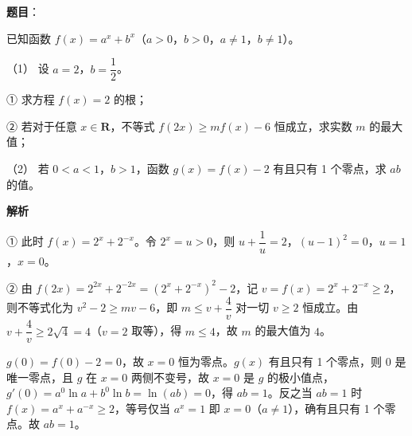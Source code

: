 \begin{answer}

\textbf{题目}：

已知函数 \(f(x)=a^{x}+b^{x}\)（\(a>0\)，\(b>0\)，\(a\neq1\)，\(b\neq1\)）。

（1） 设 \(a=2\)，\(b=\dfrac{1}{2}\)。

① 求方程 \(f(x)=2\) 的根；

② 若对于任意 \(x\in\mathbf{R}\)，不等式 \(f(2x)\geqslant mf(x)-6\) 恒成立，求实数 \(m\) 的最大值；

（2） 若 \(0<a<1\)，\(b>1\)，函数 \(g(x)=f(x)-2\) 有且只有 1 个零点，求 \(ab\) 的值。

\textbf{解析}


① 此时 \(f(x)=2^{x}+2^{-x}\)。令 \(2^{x}=u>0\)，则 \(u+\dfrac{1}{u}=2\)，\((u-1)^{2}=0\)，\(u=1\)，\(x=0\)。

② 由 \(f(2x)=2^{2x}+2^{-2x}=(2^{x}+2^{-x})^{2}-2\)，记 \(v=f(x)=2^{x}+2^{-x}\geqslant2\)，则不等式化为 \(v^{2}-2\geqslant mv-6\)，即 \(m\leqslant v+\dfrac{4}{v}\) 对一切 \(v\geqslant2\) 恒成立。由 \(v+\dfrac{4}{v}\geqslant2\sqrt{4}=4\)（\(v=2\) 取等），得 \(m\leqslant4\)，故 \(m\) 的最大值为 \(4\)。


\(g(0)=f(0)-2=0\)，故 \(x=0\) 恒为零点。\(g(x)\) 有且只有 1 个零点，则 \(0\) 是唯一零点，且 \(g\) 在 \(x=0\) 两侧不变号，故 \(x=0\) 是 \(g\) 的极小值点，\(g'(0)=a^{0}\ln a+b^{0}\ln b=\ln(ab)=0\)，得 \(ab=1\)。反之当 \(ab=1\) 时 \(f(x)=a^{x}+a^{-x}\geqslant2\)，等号仅当 \(a^{x}=1\) 即 \(x=0\)（\(a\neq1\)），确有且只有 1 个零点。故 \(ab=1\)。



\end{answer}
